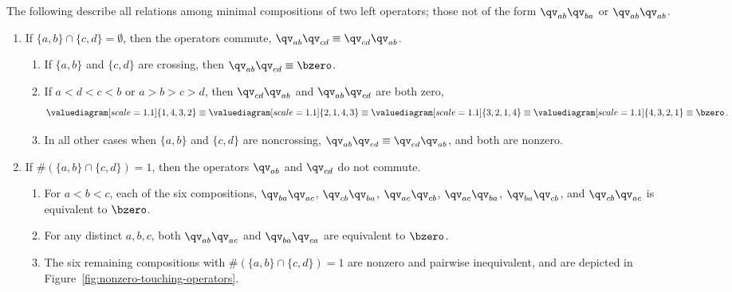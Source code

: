 \begin{lemma}\label{Lem:Rel}
 The following describe all relations among minimal compositions of two left operators; those not of the form $\qv_{ab} \qv_{ba}$ or
 $\qv_{ab} \qv_{ab}$. 
 \begin{enumerate}
   \item If $\{a,b\}\cap\{c,d\}=\emptyset$, then the operators commute,  ${\qv}_{ab}{\qv}_{cd} \equiv {\qv}_{cd}{\qv}_{ab}$.
      \begin{enumerate}[itemsep=1ex, topsep=1ex, label=(\roman*)]
   
      \item \label{Rel:1:i}
        If $\{a,b\}$ and $\{c,d\}$  are crossing, then $\qv_{ab}\qv_{cd}  \equiv \bzero$.

      \item  \label{Rel:1:ii}
        If  $a<d<c<b$ or $a>b>c>d$, then  $\qv_{cd}\qv_{ab}$ and $\qv_{ab}\qv_{cd}$ are both zero,
          \[
             \valuediagram[scale=1.1]{{1,4},{3,2}}\equiv
             \valuediagram[scale=1.1]{{2,1},{4,3}}\equiv
             \valuediagram[scale=1.1]{{3,2},{1,4}}\equiv
             \valuediagram[scale=1.1]{{4,3},{2,1}}\equiv \bzero\,. 
          \]        
        \item  \label{Rel:1:iii}
          In all other cases when $\{a,b\}$ and $\{c,d\}$ are noncrossing, $\qv_{ab}\qv_{cd}\equiv\qv_{cd}\qv_{ab}$, 
         and both are  nonzero.
     \end{enumerate}
        
   \item If $\#(\{a,b\}\cap\{c,d\})=1$, then the operators $\qv_{ab}$ and $\qv_{cd}$ do not commute.
     \begin{enumerate}[itemsep=1ex, topsep=1ex, label=(\roman*)]

     \item  \label{Rel:2:i}
       For $a<b<c$, each of the six compositions,
       $\qv_{ba}\qv_{ac}$,   $\qv_{cb}\qv_{ba}$,   $\qv_{ac}\qv_{cb}$,   $\qv_{ac}\qv_{ba}$,   $\qv_{ba}\qv_{cb}$, and  $\qv_{cb}\qv_{ac}$
       is equivalent to $\bzero$.

     \item   \label{Rel:2:ii}
       For any distinct $a,b,c$, both $\qv_{ab}\qv_{ac}$ and $\qv_{ba}\qv_{ca}$ are  equivalent to $\bzero$.

     \item  \label{Rel:2:iii}
       The six remaining compositions with  $\#(\{a,b\}\cap\{c,d\})=1$ are nonzero and pairwise inequivalent, and are
         depicted in Figure~\ref{fig:nonzero-touching-operators}.
     \end{enumerate}
  \end{enumerate}
\end{lemma}

